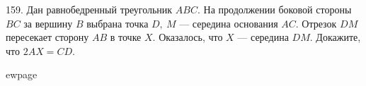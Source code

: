 159. Дан равнобедренный треугольник $ABC.$ На продолжении боковой стороны $BC$ за вершину $B$ выбрана точка $D,\ M$ --- середина основания $AC.$
Отрезок $DM$ пересекает сторону $AB$ в точке $X.$ Оказалось, что $X$ --- середина $DM.$ Докажите, что $2AX = CD.$

ewpage
